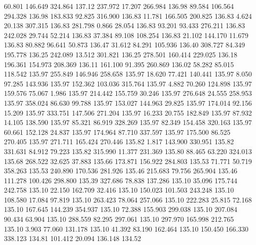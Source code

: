   60.801  146.649  324.864       137.12
 237.972   17.207  266.984       136.98
  89.584  106.564  294.328       136.98
 183.833   92.825  316.900       136.83
  11.781  166.505  200.825       136.83
   4.624   20.138  307.315       136.83
 281.798    0.866   28.054       136.83
  93.201   93.433  276.211       136.83
 242.028   29.744   52.214       136.83
  37.384   89.108  108.254       136.83
  21.102  144.170   11.679       136.83
  80.882   96.641   50.873       136.47
  31.612   84.291  105.936       136.40
 308.727   84.349  195.778       136.25
 242.089   13.512  301.821       136.25
 278.501  160.414  229.025       136.18
 196.361  154.973  208.369       136.11
 161.100   91.395  260.869       136.02
  58.282   85.015  118.542       135.97
 255.849  146.946  258.658       135.97
  18.620   77.421  140.441       135.97
   8.050   97.285  143.936       135.97
 152.362  103.036  315.764       135.97
   4.882   70.260  124.898       135.97
 159.576   75.067    1.986       135.97
 214.442  155.759   30.246       135.97
 276.648   24.555  258.953       135.97
 358.024   86.630   99.788       135.97
 153.027  144.963   29.825       135.97
 174.014   92.156   15.209       135.97
 333.751  147.506  271.204       135.97
  16.233   20.755  182.849       135.97
  87.932   14.105  138.590       135.97
  85.321   86.919  328.269       135.97
  82.349  154.458  320.163       135.97
  60.661  152.128   24.837       135.97
 174.964   87.710  337.597       135.97
 175.500   86.525  270.405       135.97
 271.711  165.424  270.446       135.82
   1.817  143.900  330.951       135.82
 331.631   84.912   79.223       135.82
 315.990   11.377  231.369       135.80
  88.465   63.220  324.013       135.68
 268.522   32.625   37.883       135.66
 173.871  156.922  284.803       135.53
  71.771   50.719  358.263       135.53
 240.890  170.536  281.926       135.46
 215.683   79.756  265.904       135.46
 111.278  100.426  298.800       135.39
 327.686   78.838  137.286       135.10
  35.096  175.744  242.758       135.10
  22.150  162.709   32.416       135.10
 150.023  101.503  243.248       135.10
 108.580   17.084   97.819       135.10
 263.423   78.064  257.066       135.10
 222.283   25.815   72.168       135.10
 167.645  144.239  354.937       135.10
  72.388  155.903  299.038       135.10
 207.084   90.434   63.904       135.10
 288.559   82.295  297.061       135.10
 297.970  165.998  212.765       135.10
   3.903   77.060  131.178       135.10
  41.392   83.190  162.464       135.10
 150.450  166.330  338.123       134.81
 101.412   20.094  136.148       134.52
